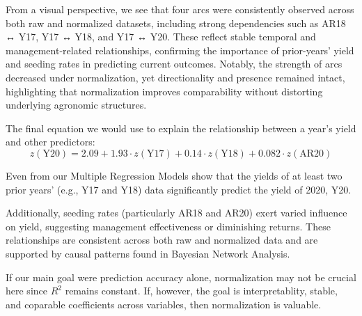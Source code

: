 \documentclass[
]{article}
\begin{document}
{\bfseries

From a visual perspective, we see that four arcs were consistently observed across both raw and normalized datasets, including strong dependencies such as AR18 ↔ Y17, Y17 ↔ Y18, and Y17 ↔ Y20. These reflect stable temporal and management-related relationships, confirming the importance of prior-years' yield and seeding rates in predicting current outcomes. Notably, the strength of arcs decreased under normalization, yet directionality and presence remained intact, highlighting that normalization improves comparability without distorting underlying agronomic structures.

The final equation we would use to explain the relationship between a year's yield and other predictors: $$
z(\text{Y20}) = 2.09 + 1.93 \cdot z(\text{Y17}) + 0.14 \cdot z(\text{Y18}) + 0.082 \cdot z(\text{AR20})
$$

Even from our Multiple Regression Models show that the yields of at least two prior years' (e.g., Y17 and Y18) data significantly predict the yield of 2020, Y20. 

Additionally, seeding rates (particularly AR18 and AR20) exert varied influence on yield, suggesting management effectiveness or diminishing returns. These relationships are consistent across both raw and normalized data and are supported by causal patterns found in Bayesian Network Analysis.  

If our main goal were prediction accuracy alone, normalization may not be crucial here since $R^2$ remains constant. If, however, the goal is interpretablity, stable, and coparable coefficients across variables, then normalization is valuable.
}
\end{document}
